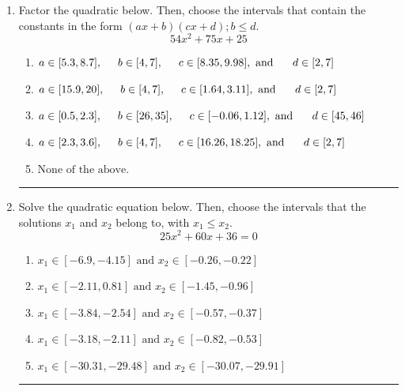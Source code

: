 \documentclass[14pt]{extbook}
\newcommand{\litem}[1]{\item#1\hspace*{-1cm}\rule{\textwidth}{0.4pt}}
\begin{document}
\begin{enumerate}
{\begin{enumerate}[label=\Alph*.]
\end{enumerate} }
\litem{
Factor the quadratic below. Then, choose the intervals that contain the constants in the form $(ax+b)(cx+d); b \leq d.$\[ 54x^{2} +75 x + 25 \]\begin{enumerate}[label=\Alph*.]
\item \( a \in [5.3, 8.7], \hspace*{5mm} b \in [4, 7], \hspace*{5mm} c \in [8.35, 9.98], \text{ and } \hspace*{5mm} d \in [2, 7] \)
\item \( a \in [15.9, 20], \hspace*{5mm} b \in [4, 7], \hspace*{5mm} c \in [1.64, 3.11], \text{ and } \hspace*{5mm} d \in [2, 7] \)
\item \( a \in [0.5, 2.3], \hspace*{5mm} b \in [26, 35], \hspace*{5mm} c \in [-0.06, 1.12], \text{ and } \hspace*{5mm} d \in [45, 46] \)
\item \( a \in [2.3, 3.6], \hspace*{5mm} b \in [4, 7], \hspace*{5mm} c \in [16.26, 18.25], \text{ and } \hspace*{5mm} d \in [2, 7] \)
\item \( \text{None of the above.} \)

\end{enumerate} }
\litem{
Solve the quadratic equation below. Then, choose the intervals that the solutions $x_1$ and $x_2$ belong to, with $x_1 \leq x_2$.\[ 25x^{2} +60 x + 36 = 0 \]\begin{enumerate}[label=\Alph*.]
\item \( x_1 \in [-6.9, -4.15] \text{ and } x_2 \in [-0.26, -0.22] \)
\item \( x_1 \in [-2.11, 0.81] \text{ and } x_2 \in [-1.45, -0.96] \)
\item \( x_1 \in [-3.84, -2.54] \text{ and } x_2 \in [-0.57, -0.37] \)
\item \( x_1 \in [-3.18, -2.11] \text{ and } x_2 \in [-0.82, -0.53] \)
\item \( x_1 \in [-30.31, -29.48] \text{ and } x_2 \in [-30.07, -29.91] \)


\end{enumerate}}
\end{enumerate}
\end{document}
